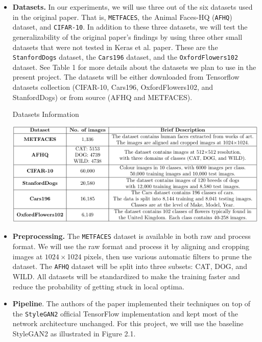 \documentclass{report}
\begin{document}
\begin{itemize}
    \item \textbf{Datasets.} In our experiments, we will use three out of the six datasets used in the original paper. That is, {\tt METFACES}, the Animal Faces-HQ ({\tt AFHQ}) dataset, and {\tt CIFAR-10}. In addition to these three datasets, we will test the generalizability of the original paper's findings by using three other small datasets that were not tested in Keras et al. paper. These are the {\tt StanfordDogs} dataset, the {\tt Cars196} dataset, and the {\tt OxfordFlowers102} dataset. See Table 1 for more details about the datasets we plan to use in the present project. The datasets will be either downloaded from Tensorflow datasets collection (CIFAR-10, Cars196, OxfordFlowers102, and StanfordDogs) or from source (AFHQ and METFACES).
    
    \begin{table}[!ht]

        \centering 
        \caption{Datasets Information}
        \includegraphics[width=1\textwidth]{figs/table_1.png}
    \end{table}

    
    \item \textbf{Preprocessing.} The {\tt METFACES} dataset is available in both raw and process format. We will use the raw format and process it by aligning and cropping images at $1024 \times $1024 pixels, then use various automatic filters to prune the dataset. The {\tt AFHQ} dataset will be split into three subsets: CAT, DOG, and WILD. All datasets will be standardized to make the training faster and reduce the probability of getting stuck in local optima.
    
    \item \textbf{Pipeline}.
    The authors of the paper implemented their techniques on top of the {\tt StyleGAN2} ofﬁcial TensorFlow implementation and kept most of the network architecture unchanged.  For this project, we will use the baseline StyleGAN2 as illustrated in Figure 2.1.\\
    

\end{itemize}
\end{document}
